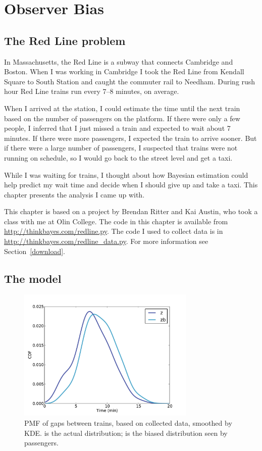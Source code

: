 \documentclass[12pt]{book}
\theoremstyle{exercise}
\begin{document}
\chapter{Observer Bias}
\label{observer}

\section{The Red Line problem}

In Massachusetts, the Red Line is a subway that connects
Cambridge and Boston.  When I was working in Cambridge I took the Red
Line from Kendall Square to South Station and caught the commuter rail
to Needham.  During rush hour Red Line trains run every 7--8
minutes, on average.

When I arrived at the station, I could estimate the time until
the next train based on the number of passengers on the platform.
If there were only a few people, I inferred that I just missed
a train and expected to wait about 7 minutes.  If there were
more passengers, I expected the train to arrive sooner.  But if
there were a large number of passengers, I suspected that
trains were not running on schedule, so I would go back to the
street level and get a taxi.

While I was waiting for trains, I thought about how Bayesian
estimation could help predict my wait time and decide when I
should give up and take a taxi.  This chapter presents the
analysis I came up with.

This chapter is based on a project by Brendan Ritter and
Kai Austin, who took a class with me at Olin College.
The code in this chapter is available from
\url{http://thinkbayes.com/redline.py}.  The code I used
to collect data is in \url{http://thinkbayes.com/redline_data.py}.
  For more information
see Section~\ref{download}.


\section{The model}

\begin{figure}
\centerline{\includegraphics[height=2.5in]{figs/redline0.pdf}}
\caption{PMF of gaps between trains, based on collected data,
smoothed by KDE.   is the actual distribution; 
is the biased distribution seen by passengers. }
\label{fig.redline0}
\end{figure}
\end{document}
